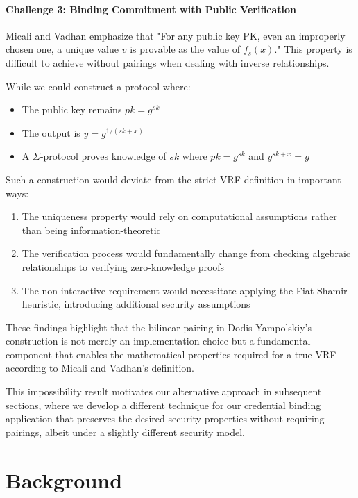 \paragraph{Challenge 3: Binding Commitment with Public Verification} Micali and Vadhan emphasize that "For any public key PK, even an improperly chosen one, a unique value $v$ is provable as the value of $f_s(x)$." This property is difficult to achieve without pairings when dealing with inverse relationships.

While we could construct a protocol where:
\begin{itemize}
    \item The public key remains $pk = g^{sk}$
    \item The output is $y = g^{1/(sk+x)}$
    \item A $\Sigma$-protocol proves knowledge of $sk$ where $pk = g^{sk}$ and $y^{sk+x} = g$
\end{itemize}

Such a construction would deviate from the strict VRF definition in important ways:

\begin{enumerate}
    \item The uniqueness property would rely on computational assumptions rather than being information-theoretic
    \item The verification process would fundamentally change from checking algebraic relationships to verifying zero-knowledge proofs
    \item The non-interactive requirement would necessitate applying the Fiat-Shamir heuristic, introducing additional security assumptions
\end{enumerate}

These findings highlight that the bilinear pairing in Dodis-Yampolskiy's construction is not merely an implementation choice but a fundamental component that enables the mathematical properties required for a true VRF according to Micali and Vadhan's definition.

This impossibility result motivates our alternative approach in subsequent sections, where we develop a different technique for our credential binding application that preserves the desired security properties without requiring pairings, albeit under a slightly different security model.





\section{Background}


